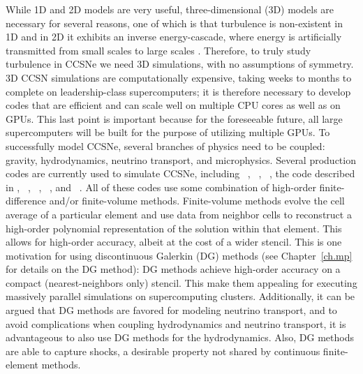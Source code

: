 While 1D and 2D models are very useful,
three-dimensional (3D) models are necessary for several reasons,
one of which is that turbulence is non-existent in 1D and in 2D it
exhibits an inverse energy-cascade, where energy is artificially transmitted
from small scales to large scales \citep{k1967}.
Therefore, to truly study turbulence in CCSNe we need 3D simulations,
with no assumptions of symmetry.
3D CCSN simulations are computationally expensive,
taking weeks to months to complete
on leadership-class supercomputers; it is therefore
necessary to develop codes that are efficient and can scale well on
multiple CPU cores as well as on GPUs.
This last point is important because for the foreseeable future, all
large supercomputers will be built for the purpose of utilizing
multiple GPUs.
To successfully model CCSNe, several branches of physics need to be coupled:
gravity, hydrodynamics, neutrino transport, and microphysics.
Several production codes are currently used to simulate CCSNe, including
\flashx\ \citep{for2000,dwo2022},
\cocov\ \citep{mjd2010},
\zelmani\ \citep{oao2012},
the code described in \citet{ktk2016},
\fornax\ \citep{sdb2019},
\nadafld\ \citep{rjj2019},
\chimera\ \citep{bbh2020},
and \gmunu\ \citep{cht2023}.
All of these codes use some combination of high-order finite-difference
and/or finite-volume methods.
Finite-volume methods \citep[e.g., see][]{l2002} evolve the cell average
of a particular element and use data from neighbor cells to reconstruct
a high-order polynomial representation of the solution within that element.
This allows for high-order accuracy, albeit at the cost of a wider stencil.
This is one motivation for using discontinuous Galerkin (DG) methods
(see Chapter~\ref{ch.mp} for details on the DG method):
DG methods achieve high-order accuracy on a compact (nearest-neighbors only)
stencil.
This make them appealing for executing massively parallel simulations on
supercomputing clusters.
Additionally, it can be argued that DG methods are favored for
modeling neutrino transport,
and to avoid complications when coupling hydrodynamics and neutrino transport,
it is advantageous to also use DG methods for the hydrodynamics.
Also, DG methods are able to capture shocks,
a desirable property not shared by continuous finite-element methods.


